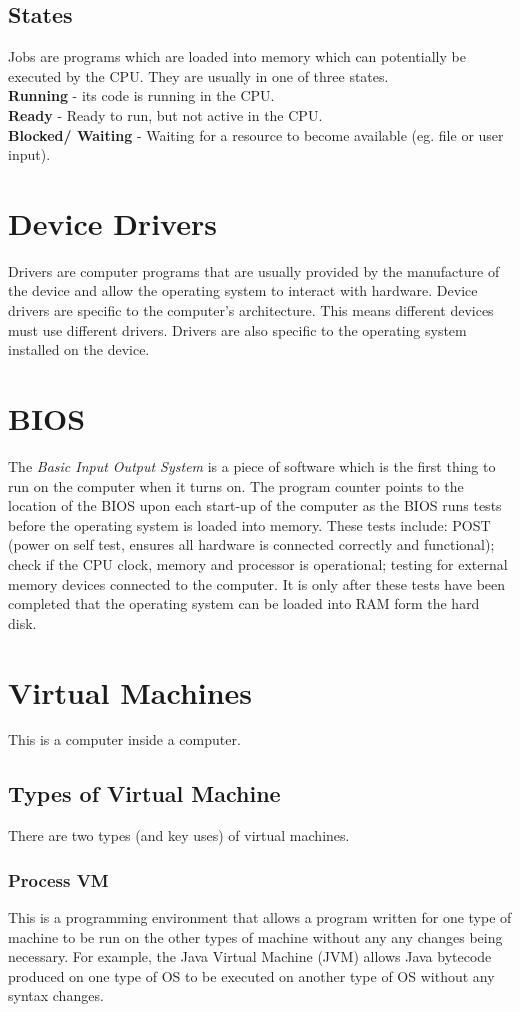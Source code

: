 \documentclass[a4paper,11pt, twocolumn]{article}
\begin{document}
\subsection{States}
Jobs are programs which are loaded into memory which can potentially be executed by the CPU. They are usually in one of three states.\\
\textbf{Running} - its code is running in the CPU.\\
\textbf{Ready} - Ready to run, but not active in the CPU.\\
\textbf{Blocked/ Waiting} - Waiting for a resource to become available (eg. file or user input).

\section{Device Drivers}
Drivers are computer programs that are usually provided by the manufacture of the device and allow the operating system to interact with hardware. Device drivers are specific to the computer's architecture. This means different devices must use different drivers. Drivers are also specific to the operating system installed on the device. 

\section{BIOS}
The \textit{Basic Input Output System} is a piece of software which is the first thing to run on the computer when it turns on. The program counter points to the location of the BIOS upon each start-up of the computer as the BIOS runs tests before the operating system is loaded into memory. These tests include: POST (power on self test, ensures all hardware is connected correctly and functional); check if the CPU clock, memory and processor is operational; testing for external memory devices connected to the computer. It is only after these tests have been completed that the operating system can be loaded into RAM form the hard disk. 

\section{Virtual Machines}
This is a computer inside a computer.
\subsection{Types of Virtual Machine}
There are two types (and key uses) of virtual machines.
\subsubsection{Process VM}
This is a programming environment that allows a program written for one type of machine to be run on the other types of machine without any any changes being necessary. For example, the Java Virtual Machine (JVM) allows Java bytecode produced on one type of OS to be executed on another type of OS without any syntax changes. 
\end{document}
